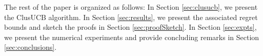 The rest of the paper is organized as follows: In Section \ref{sec:clusucb}, we present the ClusUCB algorithm. In Section \ref{sec:results}, we present the associated regret bounds and sketch the proofs in Section \ref{sec:proofSketch}. In Section \ref{sec:expts}, we present the numerical experiments and provide concluding remarks in Section \ref{sec:conclusions}. 
